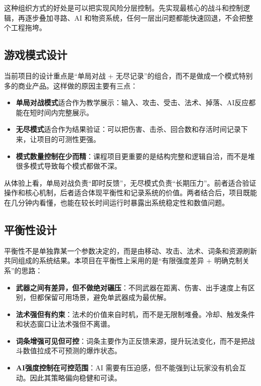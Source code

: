 ﻿\documentclass[utf8]{ctexart}
\begin{document}
这种组织方式的好处是可以把实现风险分层控制。先实现最核心的战斗和控制逻辑，再逐步叠加寻路、AI 和物资系统，任何一层出问题都能快速回退，不会把整个工程拖垮。

\subsection{游戏模式设计}

当前项目的设计重点是“单局对战 + 无尽记录”的组合，而不是做成一个模式特别多的商业产品。这样做的原因主要有三点：

\begin{itemize}
  \item \textbf{单局对战模式}适合作为教学展示：输入、攻击、受击、法术、掉落、AI反应都能在短时间内完整展示。
  \item \textbf{无尽模式}适合作为结果验证：可以把伤害、击杀、回合数和存活时间记录下来，让项目的可测性更强。
  \item \textbf{模式数量控制在少而精}：课程项目更重要的是结构完整和逻辑自洽，而不是堆很多模式导致每个模式都做不深。
\end{itemize}

从体验上看，单局对战负责“即时反馈”，无尽模式负责“长期压力”。前者适合验证操作和核心机制，后者适合体现平衡性和记录系统的价值。两者结合后，项目既能在几分钟内看懂，也能在较长时间运行时暴露出系统稳定性和数值问题。

\subsection{平衡性设计}

平衡性不是单独靠某一个参数决定的，而是由移动、攻击、法术、词条和资源刷新共同组成的系统结果。本项目在平衡性上采用的是“有限强度差异 + 明确克制关系”的思路：

\begin{itemize}
  \item \textbf{武器之间有差异，但不做绝对碾压}：不同武器在距离、伤害、出手速度上有区别，但都保留可用场景，避免单武器成为最优解。
  \item \textbf{法术强但有约束}：法术的价值来自时机，而不是无限制堆叠。冷却、触发条件和状态窗口让法术强但不离谱。
  \item \textbf{词条增强可见但可控}：词条主要作为正反馈来源，提升玩法变化，而不是把战斗数值拉成不可预测的爆炸状态。
  \item \textbf{AI强度控制在可控范围}：AI 需要有压迫感，但不能强到让玩家没有机会互动。因此其策略偏向稳健和可读。
\end{itemize}
\end{document}
